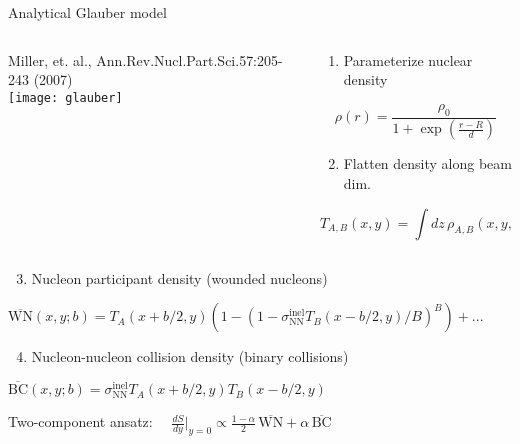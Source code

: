 \documentclass[svgnames]{beamer}
\begin{document}
\begin{frame}{Analytical Glauber model}

  \begin{columns}
  
   \begin{column}{0.5\textwidth}
   \centering
   \vspace{0.1 in} \tiny Miller, et. al., Ann.Rev.Nucl.Part.Sci.57:205-243 (2007) \\
   \texttt{[image: glauber]}
   \end{column}
  
   \begin{column}{0.5\textwidth}
   
    \begin{enumerate}
      \small \item Parameterize nuclear density
    \end{enumerate}
   \vspace{-0.025 in}
   \begin{equation*}
    \rho(r) = \frac{\rho_0}{1+\exp(\tfrac{r-R}{d})}
   \end{equation*}
   
   \begin{enumerate}
   \setcounter{enumi}{1}
    \small \item Flatten density along beam dim.
   \end{enumerate}
   \vspace{-0.025 in}
   \begin{equation*}
    T_{A,B}(x,y) = \int dz\, \rho_{A,B}(x,y,z)
   \end{equation*}
  
  \end{column}
  \end{columns}
   
  \begin{enumerate}
  \setcounter{enumi}{2}
    \small \item Nucleon participant density (wounded nucleons) 
  \end{enumerate}
  \vspace{-0.05 in}
  $\overline{\text{WN}}(x,y; b) = T_A(x+b/2,y)\left(1-\left(1-\sigma_\text{NN}^\text{inel} T_B(x-b/2,y)/B \right)^B \right) + ...$
  \vspace{0.1 in}
  \begin{enumerate}
    \setcounter{enumi}{3}
    \small \item Nucleon-nucleon collision density (binary collisions) 
  \end{enumerate}
  \vspace{0.025 in}
  $\overline{\text{BC}}(x,y; b) = \sigma_\text{NN}^\text{inel} T_A(x+b/2,y)  T_B(x-b/2,y)$
  
  \begin{block}{\vspace*{-3ex}}
   \centering
   Two-component ansatz:~~ $\frac{dS}{dy} \big \vert_{y=0} \propto \frac{1-\alpha}{2}\, \overline{\text{WN}} + \alpha\, \overline{\text{BC}}$
  \end{block}

\end{frame}
\end{document}
